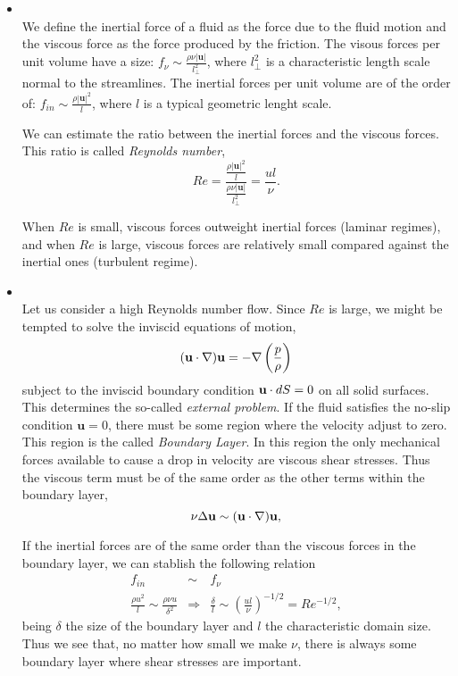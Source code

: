 \begin{itemize}

\item{}\\We define the inertial force of a fluid as the force due to the fluid motion and the viscous force as the force produced by the friction. The visous forces per unit volume have a size: $ f_\nu\sim\frac{\rho\nu|\mathbf{u}|}{l_\bot^2} $, where $ l_\bot^2 $ is a characteristic length scale normal to the streamlines. The inertial forces per unit volume are of the order of: $ f_{in}\sim\frac{\rho |\mathbf{u}|^2}{l} $, where $ l $ is a typical geometric lenght scale. 

We can estimate the ratio between the inertial forces and the viscous forces. This ratio is called \textit{Reynolds number},
$$Re=\frac{\frac{\rho |\mathbf{u}|^2}{l}}{\frac{\rho\nu|\mathbf{u}|}{l_\bot^2}}=\frac{ul}{\nu}.$$

When $ Re $ is small, viscous forces outweight inertial forces (laminar regimes), and when $ Re $ is large, viscous forces are relatively small compared against the inertial ones (turbulent regime).

\item{}\\ Let us consider a high Reynolds number flow. Since $Re$ is large, we might be tempted to solve the inviscid equations of motion, 
$$({\bf u}\cdot\nabla){\bf u}=-\nabla\left(\frac{p}{\rho}\right)$$
subject to the inviscid boundary condition ${\bf u}\cdot dS=0$ on all solid surfaces. This determines the so-called \textit{external problem}. If the fluid satisfies the no-slip condition $\mathbf{u}=0$, there must be some region where the velocity adjust to zero. This region is the called \textit{Boundary Layer}. In this region the only mechanical forces available to cause a drop in velocity are viscous shear stresses. Thus the viscous term must be of the same order as the other terms within the boundary layer, 
$$\nu\Delta{\bf u}\sim({\bf u}\cdot\nabla){\bf u},$$

If the inertial forces are of the same order than the viscous forces in the boundary layer, we can stablish the following relation
\begin{eqnarray*}
f_{in}&\sim& f_\nu\\
\frac{\rho u^2}{l} \sim\frac{\rho\nu u}{\delta^2} &\Rightarrow& \frac{\delta}{l}\sim\left(\frac{ul}{\nu}\right)^{-1/2}=Re^{-1/2},
\end{eqnarray*}
being $\delta$ the size of the boundary layer and $l$ the characteristic domain size. Thus we see that, no matter how small we make $\nu$, there is always some boundary layer where shear stresses are important.


\end{itemize}
